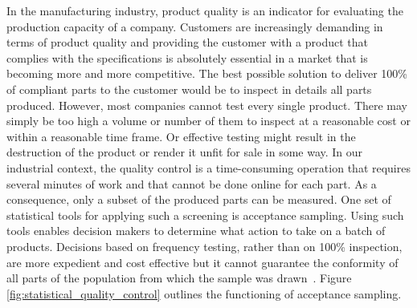 In the manufacturing industry, product quality is an indicator for evaluating the production capacity of a company. Customers are increasingly demanding in terms of product quality and providing the customer with a product that complies with the specifications is absolutely essential in a market that is becoming more and more competitive. The best possible solution to deliver 100\% of compliant parts to the customer would be to inspect in details all parts produced. However, most companies cannot test every single product. There may simply be too high a volume or number of them to inspect at a reasonable cost or within a reasonable time frame. Or effective testing might result in the destruction of the product or render it unfit for sale in some way. In our industrial context, the quality control is a time-consuming operation that requires several minutes of work and that cannot be done online for each part. As a consequence, only a subset of the produced parts can be measured. One set of statistical tools for applying such a screening is acceptance sampling. Using such tools enables decision makers to determine what action to take on a batch of products. Decisions based on frequency testing, rather than on 100\% inspection, are more expedient and cost effective but it cannot guarantee the conformity of all parts of the population from which the sample was drawn~\citep{fuchs1998multivariate}.
Figure \ref{fig:statistical_quality_control} outlines the functioning of acceptance sampling. 

